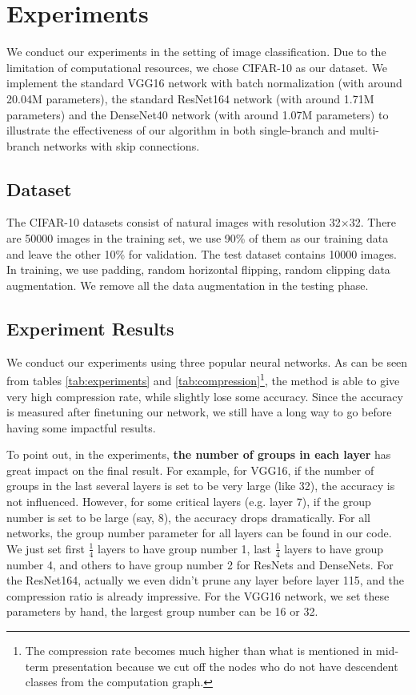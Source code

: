 \documentclass{acmtog} %
\begin{document}
\section{Experiments}

We conduct our experiments in the setting of image classification. Due to the limitation of computational resources, we chose CIFAR-10 \cite{CIFAR} as our dataset. We implement the standard VGG16 network with batch normalization (with around 20.04M parameters), the standard ResNet164 network (with around 1.71M parameters) and the DenseNet40 network (with around 1.07M parameters) to illustrate the effectiveness of our algorithm in both single-branch and multi-branch networks with skip connections.
\subsection{Dataset}
The CIFAR-10 datasets \cite{CIFAR} consist of natural images with resolution 32$\times$32. There are 50000 images in the training set, we use 90\% of them as our training data and leave the other 10\% for validation. The test dataset contains 10000 images. In training, we use padding, random horizontal flipping, random clipping data augmentation. We remove all the data augmentation in the testing phase.
\subsection{Experiment Results}
We conduct our experiments using three popular neural networks. As can be seen from tables \ref{tab:experiments} and \ref{tab:compression}\footnote{The compression rate becomes much higher than what is mentioned in mid-term presentation because we cut off the nodes who do not have descendent classes from the computation graph.}, the method is able to give very high compression rate, while slightly lose some accuracy. Since the accuracy is measured after finetuning our network, we still have a long way to go before having some impactful results.

To point out, in the experiments, \textbf{the number of groups in each layer} has great impact on the final result. For example, for VGG16, if the number of groups in the last several layers is set to be very large (like 32), the accuracy is not influenced. However, for some critical layers (e.g. layer 7), if the group number is set to be large (say, 8), the accuracy drops dramatically. For all networks, the group number parameter for all layers can be found in our code. We just set first $\frac{1}{4}$ layers to have group number 1, last $\frac{1}{4}$ layers to have group number 4, and others to have group number 2 for ResNets and DenseNets. For the ResNet164, actually we even didn't prune any layer before layer 115, and the compression ratio is already impressive. For the VGG16 network, we set these parameters by hand, the largest group number can be 16 or 32.
\end{document}
